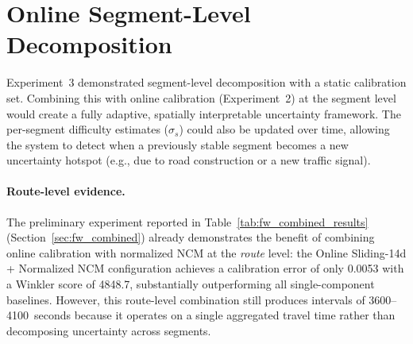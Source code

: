\section{Online Segment-Level Decomposition}
\label{sec:fw_online_segment}

Experiment~3 demonstrated segment-level decomposition with a static calibration set. Combining this with online calibration (Experiment~2) at the segment level would create a fully adaptive, spatially interpretable uncertainty framework. The per-segment difficulty estimates ($\sigma_s$) could also be updated over time, allowing the system to detect when a previously stable segment becomes a new uncertainty hotspot (e.g., due to road construction or a new traffic signal).

\paragraph{Route-level evidence.} The preliminary experiment reported in Table~\ref{tab:fw_combined_results} (Section~\ref{sec:fw_combined}) already demonstrates the benefit of combining online calibration with normalized NCM at the \emph{route} level: the Online Sliding-14d + Normalized NCM configuration achieves a calibration error of only 0.0053 with a Winkler score of 4848.7, substantially outperforming all single-component baselines. However, this route-level combination still produces intervals of 3600--4100~seconds because it operates on a single aggregated travel time rather than decomposing uncertainty across segments.


